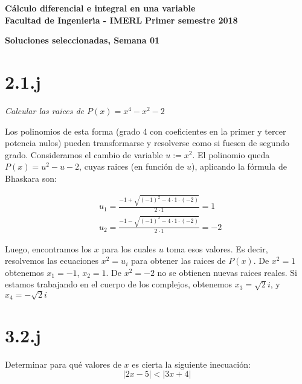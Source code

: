 \documentclass[10pt,a4paper]{article}
\begin{document}
 \hfill
          {\bf C\'{a}lculo diferencial e integral en una variable} \\
{\bf Facultad de Ingenier\'{\i}a - IMERL} \hfill {\bf Primer semestre 2018}

\vspace{0,3cm}

\begin{center}
{\bf \Large Soluciones seleccionadas, Semana 01}
\end{center}

\vspace{0,3cm}

\section*{2.1.j}

\emph{Calcular las raices de $P(x) = x^4-x^2-2$}


\noindent
Los polinomios de esta forma (grado 4 con coeficientes en la primer y tercer
potencia nulos) pueden transformarse y resolverse como si fuesen de segundo
grado.
Consideramos el cambio de variable
$u := x^2$. El polinomio queda $P(x) = u^2-u-2$,
cuyas raices (en función de $u$), aplicando la f\'ormula
de Bhaskara son:

\begin{equation*}
  \begin{split}
    &u_1 = \frac{-1 + \sqrt{(-1)^2-4\cdot 1 \cdot (-2)}}{2 \cdot 1} = 1\\
    &u_2 = \frac{-1 - \sqrt{(-1)^2-4\cdot 1 \cdot (-2)}}{2 \cdot 1} = -2
  \end{split}
\end{equation*}

\noindent
Luego, encontramos los $x$ para los cuales $u$ toma esos valores.
Es decir, resolvemos las ecuaciones $x^2 = u_i$
para obtener las raices de $P(x)$.
De $x^2=1$ obtenemos $x_1=-1$, $x_2 = 1$. De $x^2=-2$ no se obtienen nuevas
raices reales. Si estamos trabajando en el cuerpo de los complejos,
obtenemos
$x_3 = \sqrt{2} i$, y $x_4 = -\sqrt{2} i$

\section*{3.2.j}
Determinar para qué valores de $x$ es cierta la siguiente inecuaci\'on:
\begin{equation*}
  \vert 2x - 5 \vert  <  \vert 3x + 4 \vert
\end{equation*}
\end{document}
